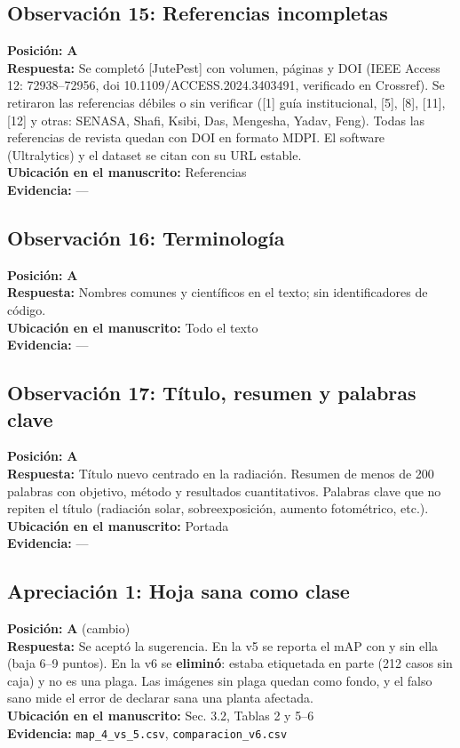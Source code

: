 \documentclass[11pt,a4paper]{article}
\begin{document}
\subsection*{Observación 15: Referencias incompletas}
\noindent\textbf{Posición:} \textbf{A}\\
\textbf{Respuesta:} Se completó [JutePest] con volumen, páginas y DOI (IEEE Access 12: 72938–72956, doi 10.1109/ACCESS.2024.3403491, verificado en Crossref). Se retiraron las referencias débiles o sin verificar ([1] guía institucional, [5], [8], [11], [12] y otras: SENASA, Shafi, Ksibi, Das, Mengesha, Yadav, Feng). Todas las referencias de revista quedan con DOI en formato MDPI. El software (Ultralytics) y el dataset se citan con su URL estable.\\
\textbf{Ubicación en el manuscrito:} Referencias\\
\textbf{Evidencia:} —

\subsection*{Observación 16: Terminología}
\noindent\textbf{Posición:} \textbf{A}\\
\textbf{Respuesta:} Nombres comunes y científicos en el texto; sin identificadores de código.\\
\textbf{Ubicación en el manuscrito:} Todo el texto\\
\textbf{Evidencia:} —

\subsection*{Observación 17: Título, resumen y palabras clave}
\noindent\textbf{Posición:} \textbf{A}\\
\textbf{Respuesta:} Título nuevo centrado en la radiación. Resumen de menos de 200 palabras con objetivo, método y resultados cuantitativos. Palabras clave que no repiten el título (radiación solar, sobreexposición, aumento fotométrico, etc.).\\
\textbf{Ubicación en el manuscrito:} Portada\\
\textbf{Evidencia:} —

\subsection*{Apreciación 1: Hoja sana como clase}
\noindent\textbf{Posición:} \textbf{A} (cambio)\\
\textbf{Respuesta:} Se aceptó la sugerencia. En la v5 se reporta el mAP con y sin ella (baja 6–9 puntos). En la v6 se \textbf{eliminó}: estaba etiquetada en parte (212 casos sin caja) y no es una plaga. Las imágenes sin plaga quedan como fondo, y el falso sano mide el error de declarar sana una planta afectada.\\
\textbf{Ubicación en el manuscrito:} Sec. 3.2, Tablas 2 y 5–6\\
\textbf{Evidencia:} \texttt{map\_4\_vs\_5.csv}, \texttt{comparacion\_v6.csv}
\end{document}
